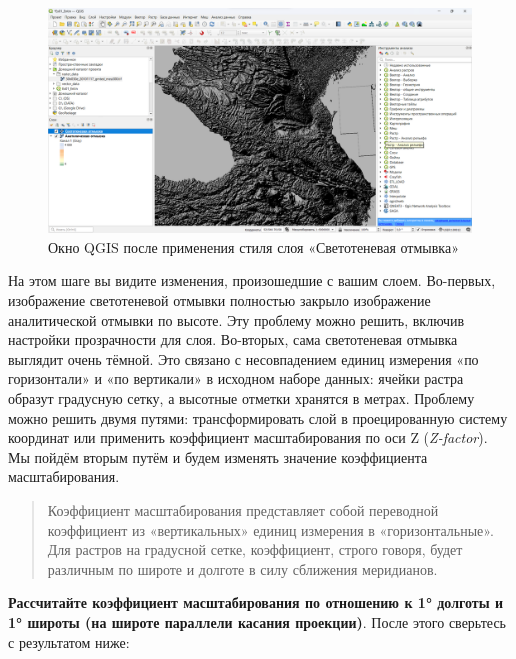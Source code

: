 \documentclass[
  12pt,
]{book}
\begin{document}
\begin{enumerate}
  \begin{figure}
  \centering
  \includegraphics{images/Ex01_MapGeneral/screen_qgis_hillshade.png}
  \caption{Окно QGIS после применения стиля слоя «Светотеневая отмывка»}
  \end{figure}

  На этом шаге вы видите изменения, произошедшие с вашим слоем. Во-первых, изображение светотеневой отмывки полностью закрыло изображение аналитической отмывки по высоте. Эту проблему можно решить, включив настройки прозрачности для слоя. Во-вторых, сама светотеневая отмывка выглядит очень тёмной. Это связано с несовпадением единиц измерения «по горизонтали» и «по вертикали» в исходном наборе данных: ячейки растра образут градусную сетку, а высотные отметки хранятся в метрах. Проблему можно решить двумя путями: трансформировать слой в проецированную систему координат или применить коэффициент масштабирования по оси Z (\emph{Z-factor}). Мы пойдём вторым путём и будем изменять значение коэффициента масштабирования.

  \begin{quote}
  Коэффициент масштабирования представляет собой переводной коэффициент из «вертикальных» единиц измерения в «горизонтальные». Для растров на градусной сетке, коэффициент, строго говоря, будет различным по широте и долготе в силу сближения меридианов.
  \end{quote}

  \textbf{Рассчитайте коэффициент масштабирования по отношению к 1° долготы и 1° широты (на широте параллели касания проекции)}. После этого сверьтесь с результатом ниже:
\end{enumerate}
\end{document}
